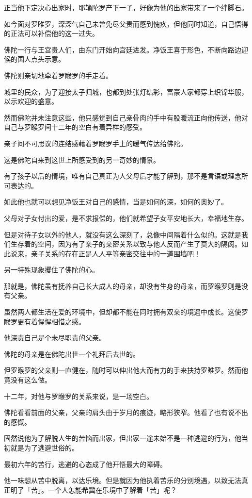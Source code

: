 \documentclass[twoside,openany]{book}
\begin{document}
正当他下定决心出家时，耶输陀罗产下一子，好像为他的出家带来了一个绊脚石。

如今面对罗睢罗，深深气自己未曾免尽父责而感到愧疚，但他同时知道，自己悟得的正法可以补偿他的这一过失。

佛陀一行与王宫贵人们，由东门开始向宫廷进发。净饭王喜于形色，不断向路边迎候的国人点头示意。

佛陀则亲切地牵着罗睺罗的手走着。

城里的民众，为了迎接太子归城，也都到处张灯结彩，富豪人家都穿上织锦华服，以示欢迎的盛意。

然而佛陀并未注意这些，他只感觉到自己亲骨肉的手中有股暖流正向他传送，他对自己与罗睺罗间十二年的空白有着异样的感受。

亲子间不可思议的连结感藉着罗睺罗手上的暖气传达给佛陀。

这是佛陀自来到这世上所感受到的另一奇妙的情景。

有了孩子以后的情境，唯有自己真正为人父母后才能了解到，那不是言语或理念所可表达的。

如此他也就可以想见净饭王对自己的感情，当是如何的深，如何的奥妙了。

父母对子女付出的爱，是不求报偿的，他们就希望子女平安地长大，幸福地生存。

但是对待子女以外的他人，就没有这么深刻了，总像中间隔着什么似的。这就是我们生存着的空间，因为有了亲子的亲密关系以致与他人反而产生了莫大的隔阂。如此说来，亲子关系的存在正是人人平等亲密交往中的一道围墙吧！

另一特殊现象攫住了佛陀的心。

那就是，佛陀虽有抚养自己长大成人的母亲，却没有生身的母亲，而罗睺罗则是没有父亲。

虽然两人都生活在爱的环境中，但却都不能在同时拥有双亲的境遇中成长。这使罗睺罗更有着惺惺相惜之感。

他深责自己是个未尽职责的父亲。

佛陀的母亲是在佛陀出世一个礼拜后去世的。

但罗睺罗的父亲则一直健在，随时可以伸出他大而有力的手来扶持罗睢罗。然而他竟没有这么做。

十二年，对他与罗睺罗的关系来说，是一场空白。

佛陀看看前面的父亲，父亲的肩头由于岁月的痕迹，略形狭窄。他看了也有说不出的感慨。

固然说他为了解脱人生的苦恼而出家，但出家一途未始不是一种逃避的行为，他当初就是为了逃避世俗的。

最初六年的苦行，逃避的心态成了他开悟最大的障碍。

他一味想从苦中脱离，以达乐境。但是就因为他执着苦乐的分别境遇，以致无法真正明了「苦」。一个人怎能希冀在乐境中了解着「苦」呢？
\end{document}
